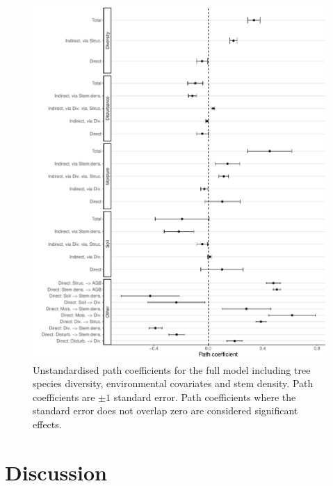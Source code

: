 \documentclass[11pt,a4paper]{article}
\begin{document}
\begin{figure}[H]
\centering
	\includegraphics[width=\textwidth]{full_model_slopes}
	\caption{Unstandardised path coefficients for the full model including tree species diversity, environmental covariates and stem density. Path coefficients are $\pm1$ standard error. Path coefficients where the standard error does not overlap zero are considered significant effects.}
	\label{full_model_slopes}
\end{figure}


\section{Discussion}
\end{document}
